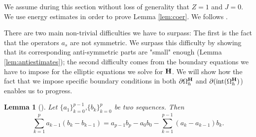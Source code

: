 \documentclass[12pt,reqno]{amsart}
\newcommand{\h}{{\bf H}}
\newtheorem{lem}[theorem]{Lemma}
\theoremstyle{definition}
\numberwithin{equation}{section}
\newcommand{\intr}[1]{\mathrm{int}(#1)}
\def\Gwh{\Omega_h}
\begin{document}
 We assume during this section without loss of generality that $Z=1$ and $J=0$.
We use energy estimates in order to prove Lemma \ref{lem:coer}. We follows \cite[chapter 11]{GKO}.

There are two main non-trivial difficulties we have to surpass:
 The first is the fact that the operators $a_s$ are not symmetric. We surpass this difficulty by showing that its corresponding  anti-symmetric parts are "small" enough (Lemma \ref{lem:antiestimates});
 the second difficulty comes from the boundary equations we have to impose for the elliptic equations   we solve for $\h$.
  We will show how the fact that  we impose specific boundary conditions  in both $\partial \Gwh^\h$ and $\partial (\intr{\Gwh^{\h}}$) enables  us to progress.  
 

\begin{lem}[\cite{Morton}]
Let $\{a_1\}_{k=0}^{p-1}$,$\{b_k\}_{k=0}^{p}$ be two sequences. Then
$$
\sum_{k=1}^{p}a_{k-1}(b_k-b_{k-1})=a_{p-1}b_p-a_{0}b_0-\sum_{k=1}^{p-1}(a_{k}-a_{k-1})b_k.
$$
\end{lem}
\end{document}
